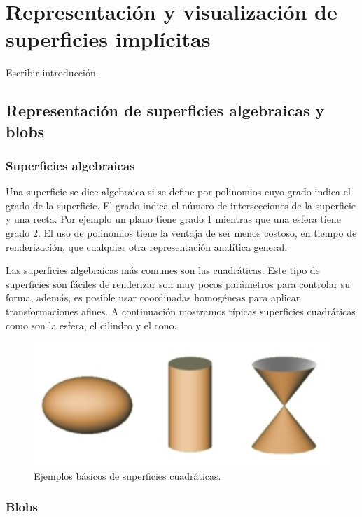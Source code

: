 \chapter{Representación y visualización de superficies implícitas}

Escribir introducción.

\section{Representación de superficies algebraicas y blobs}

\subsection{Superficies algebraicas}

Una superficie se dice algebraica si se define por polinomios cuyo grado indica el grado de la superficie. El grado indica el número de intersecciones de la superficie y una recta.\cite{Bloomenthal97} Por ejemplo un plano tiene grado 1 mientras que una esfera tiene grado 2. El uso de polinomios tiene la ventaja de ser menos costoso, en tiempo de renderización, que cualquier otra representación analítica general.
\par Las superficies algebraicas más comunes son las cuadráticas. Este tipo de superficies son fáciles de renderizar son muy pocos parámetros para controlar su forma, además, es posible usar coordinadas homogéneas para aplicar transformaciones afines. A continuación mostramos típicas superficies cuadráticas como son la esfera, el cilindro y el cono.

\begin{figure}[h]
	\centering
	\includegraphics[scale=0.7]{images/florez4.png}
	\caption{Ejemplos básicos de superficies cuadráticas.}
\end{figure}

\subsection{Blobs}

